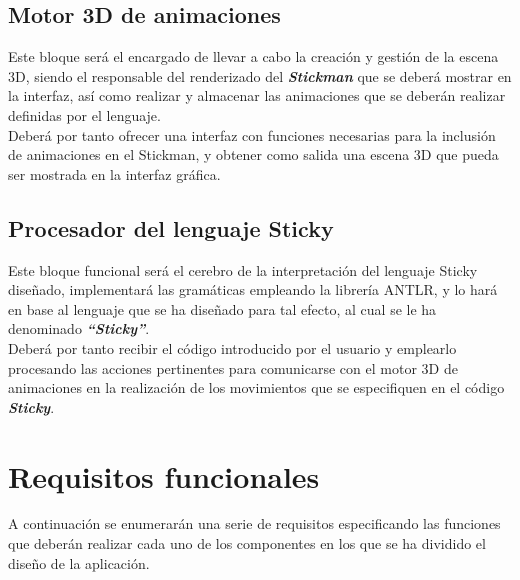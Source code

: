    \subsection*{Motor 3D de animaciones}
   Este bloque será el encargado de llevar a cabo la creación y gestión de la escena 3D, siendo el responsable del renderizado del 
   \textbf{\textit{Stickman}} que se deberá mostrar en la interfaz, así como realizar y almacenar las animaciones que se deberán realizar
   definidas por el lenguaje. \\

   Deberá por tanto ofrecer una interfaz con funciones necesarias para la inclusión de animaciones en el Stickman, y obtener como salida
   una escena 3D que pueda ser mostrada en la interfaz gráfica. \\

   \subsection*{Procesador del lenguaje Sticky}
   Este bloque funcional será el cerebro de la interpretación del lenguaje Sticky diseñado, implementará las gramáticas empleando la librería
   ANTLR, y lo hará en base al lenguaje que se ha diseñado para tal efecto, al cual se le ha denominado \textbf{\textit{``Sticky''}}.\\

   Deberá por tanto recibir el código introducido por el usuario y emplearlo procesando las acciones pertinentes para comunicarse con el 
   motor 3D de animaciones en la realización de los movimientos que se especifiquen en el código \textbf{\textit{Sticky}}. \\


   \section{Requisitos funcionales}
   A continuación se enumerarán una serie de requisitos especificando las funciones que deberán realizar cada uno de los componentes en los
   que se ha dividido el diseño de la aplicación. \\

